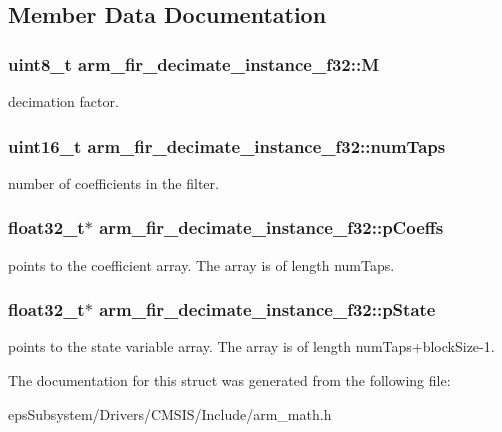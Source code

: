 \subsection{Member Data Documentation}
\hypertarget{structarm__fir__decimate__instance__f32_a76a8b2161731638eb3d67f277919f95d}{
\subsubsection[{M}]{\setlength{\rightskip}{0pt plus 5cm}uint8\-\_\-t arm\-\_\-fir\-\_\-decimate\-\_\-instance\-\_\-f32\-::\-M}}\label{structarm__fir__decimate__instance__f32_a76a8b2161731638eb3d67f277919f95d}
decimation factor. \hypertarget{structarm__fir__decimate__instance__f32_a2aa2986129db8affef03ede88dd45a03}{
\subsubsection[{num\-Taps}]{\setlength{\rightskip}{0pt plus 5cm}uint16\-\_\-t arm\-\_\-fir\-\_\-decimate\-\_\-instance\-\_\-f32\-::num\-Taps}}\label{structarm__fir__decimate__instance__f32_a2aa2986129db8affef03ede88dd45a03}
number of coefficients in the filter. \hypertarget{structarm__fir__decimate__instance__f32_a268a8b0e80a3d9764baf33e4bc10dde2}{
\subsubsection[{p\-Coeffs}]{\setlength{\rightskip}{0pt plus 5cm}float32\-\_\-t$\ast$ arm\-\_\-fir\-\_\-decimate\-\_\-instance\-\_\-f32\-::p\-Coeffs}}\label{structarm__fir__decimate__instance__f32_a268a8b0e80a3d9764baf33e4bc10dde2}
points to the coefficient array. The array is of length num\-Taps. \hypertarget{structarm__fir__decimate__instance__f32_a5bddf29aaaf2011d2e3bcec59a83f633}{
\subsubsection[{p\-State}]{\setlength{\rightskip}{0pt plus 5cm}float32\-\_\-t$\ast$ arm\-\_\-fir\-\_\-decimate\-\_\-instance\-\_\-f32\-::p\-State}}\label{structarm__fir__decimate__instance__f32_a5bddf29aaaf2011d2e3bcec59a83f633}
points to the state variable array. The array is of length num\-Taps+block\-Size-\/1. 

The documentation for this struct was generated from the following file\-:\begin{DoxyCompactItemize}
\item 
eps\-Subsystem/\-Drivers/\-C\-M\-S\-I\-S/\-Include/arm\-\_\-math.\-h\end{DoxyCompactItemize}

